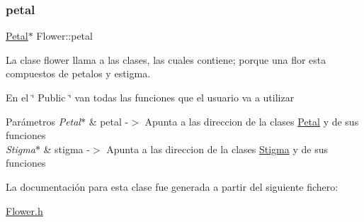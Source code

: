 \subsubsection{\texorpdfstring{petal}{petal}}
{\footnotesize\ttfamily \mbox{\hyperlink{class_petal}{Petal}}$\ast$ Flower\+::petal}



La clase flower llama a las clases, las cuales contiene; porque una flor esta compuestos de petalos y estigma. 

En el \char`\"{} Public \char`\"{} van todas las funciones que el usuario va a utilizar
\begin{DoxyParams}{Parámetros}
{\em Petal$\ast$} & petal -\/$>$ Apunta a las direccion de la clases \mbox{\hyperlink{class_petal}{Petal}} y de sus funciones \\
\hline
{\em Stigma$\ast$} & stigma -\/$>$ Apunta a las direccion de la clases \mbox{\hyperlink{class_stigma}{Stigma}} y de sus funciones \\
\hline
\end{DoxyParams}


La documentación para esta clase fue generada a partir del siguiente fichero\+:\begin{DoxyCompactItemize}
\item 
\mbox{\hyperlink{_flower_8h}{Flower.\+h}}\end{DoxyCompactItemize}
